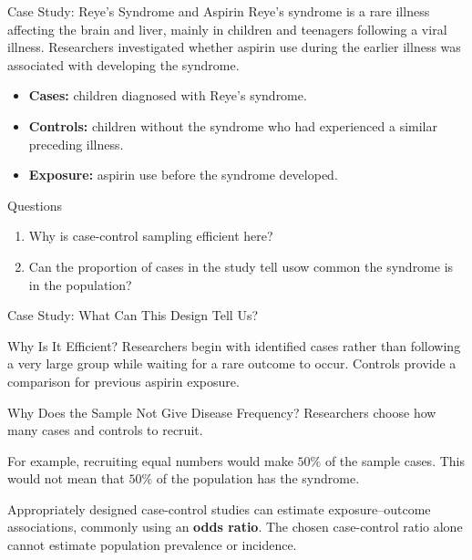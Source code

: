 \documentclass[aspectratio=169]{beamer}
\begin{document}
\begin{frame}{Case Study: Reye's Syndrome and Aspirin}
Reye's syndrome is a rare illness affecting the brain and liver, mainly in children and teenagers following a viral illness. Researchers investigated whether aspirin use during the earlier illness was associated with developing the syndrome.

\begin{itemize}
	\item \textbf{Cases:} children diagnosed with Reye's syndrome.
	\item \textbf{Controls:} children without the syndrome who had experienced a similar preceding illness.
	\item \textbf{Exposure:} aspirin use before the syndrome developed.
\end{itemize}

\begin{block}{Questions}
\begin{enumerate}
  	\item Why is case-control sampling efficient here?
	\item Can the proportion of cases in the study tell usow common the syndrome is in the population?
\end{enumerate}
\end{block}
\end{frame}

\begin{frame}{Case Study: What Can This Design Tell Us?}
\begin{block}{Why Is It Efficient?}
Researchers begin with identified cases rather than following a very large group while waiting for a rare outcome to occur. Controls provide a comparison for previous aspirin exposure.
\end{block}

\begin{block}{Why Does the Sample Not Give Disease Frequency?}
Researchers choose how many cases and controls to recruit.

For example, recruiting equal numbers would make $50\%$ of the sample cases. This would not mean that $50\%$ of the population has the syndrome.
\end{block}

Appropriately designed case-control studies can estimate exposure--outcome associations, commonly using an \textbf{odds ratio}. The chosen case-control ratio alone cannot estimate population prevalence or incidence.
\end{frame}
\end{document}
